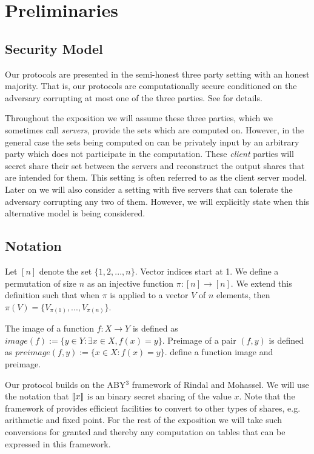 \section{Preliminaries} \label{sec:prelim}


\subsection{Security Model}

Our protocols are presented in the semi-honest three party setting with an honest majority. That is, our protocols are computationally secure conditioned on the adversary corrupting at most one of the three parties. See \cite{highthroughput,aby3} for details.



Throughout the exposition we will assume these three parties, which we sometimes call \emph{servers}, provide the sets which are computed on. However, in the general case the sets being computed on can be privately input by an arbitrary party which does not participate in the computation. These \emph{client} parties will secret share their set between the servers and reconstruct the output shares that are intended for them. This setting is often referred to as the client server model\cite{aby3, secureML}. Later on we will also consider a setting with five servers that can tolerate the adversary corrupting any two of them. However, we will explicitly state when this alternative model is being considered.



\subsection{Notation}




Let $[n]$ denote the set $\{1,2,...,n\}$. Vector indices start at 1.
We define a permutation of size $n$ as an injective function $\pi : [n] \rightarrow [n]$. We extend this definition such that when $\pi$ is applied to a vector $V$ of $n$ elements, then  $\pi(V)=\{V_{\pi(1)}, ..., V_{\pi(n)}\}$. 

The image of a function $f : X \rightarrow Y$ is defined as $image(f) := \{y\in Y : \exists x\in X, f(x)=y\}$. Preimage of a pair $(f,y)$ is defined as $preimage(f,y):=\{x\in X : f(x) = y\}$.
define a function image and preimage.



Our protocol builds on the ABY$^3$ framework of Rindal and Mohassel\cite{aby3}. We will use the notation that $\llbracket x\rrbracket$ is an binary secret sharing of the value $x$. Note that the framework of \cite{aby3} provides efficient facilities to convert to other types of shares, e.g. arithmetic and fixed point. For the rest of the exposition we will take such conversions for granted and thereby any computation on tables that can be expressed in this framework.

